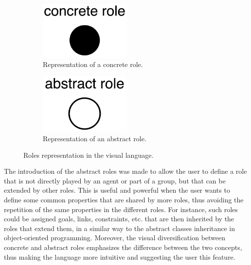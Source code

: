 \begin{figure}[H]
    \begin{subfigure}[h]{0.5\linewidth}
        \begin{center}
            \includegraphics[width=0.5\textwidth]{images/visual-language/concrete-role.png}
            \caption{Representation of a concrete role.}
            \label{fig:concrete-role}
        \end{center}
    \end{subfigure}
    \begin{subfigure}[h]{0.5\linewidth}
        \begin{center}
            \includegraphics[width=0.5\textwidth]{images/visual-language/abstract-role.png}
            \caption{Representation of an abstract role.}
            \label{fig:abstract-role}
        \end{center}
    \end{subfigure}
    \caption{Roles representation in the visual language.}
    \label{fig:roles}
\end{figure}

The introduction of the abstract roles was made to allow the user to define a role that is not directly played by an agent or part of a group, but that can be extended by other roles.
This is useful and powerful when the user wants to define some common properties that are shared by more roles, thus avoiding the repetition of the same properties in the different roles.
For instance, such roles could be assigned goals, links, constraints, etc. that are then inherited by the roles that extend them, in a similar way to the abstract classes inheritance in object-oriented programming.
Moreover, the visual diversification between concrete and abstract roles emphasizes the difference between the two concepts, thus making the language more intuitive and suggesting the user this feature.


